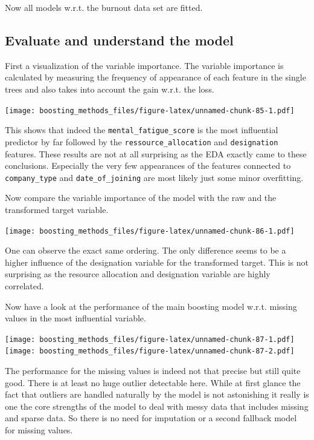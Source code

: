 \documentclass[
]{book}
\begin{document}
Now all models w.r.t. the burnout data set are fitted.

\hypertarget{evaluate-and-understand-the-model}{%
\subsection{Evaluate and understand the model}\label{evaluate-and-understand-the-model}}

First a visualization of the variable importance. The variable importance is calculated by measuring the frequency of appearance of each feature in the single trees and also takes into account the gain w.r.t. the loss.

\texttt{[image: boosting\_methods\_files/figure-latex/unnamed-chunk-85-1.pdf]}

This shows that indeed the \texttt{mental\_fatigue\_score} is the most influential predictor by far followed by the \texttt{ressource\_allocation} and \texttt{designation} features. These results are not at all surprising as the EDA exactly came to these conclusions. Especially the very few appearances of the features connected to \texttt{company\_type} and \texttt{date\_of\_joining} are most likely just some minor overfitting.

Now compare the variable importance of the model with the raw and the transformed target variable.

\texttt{[image: boosting\_methods\_files/figure-latex/unnamed-chunk-86-1.pdf]}

One can observe the exact same ordering. The only difference seems to be a higher influence of the designation variable for the transformed target. This is not surprising as the resource allocation and designation variable are highly correlated.

Now have a look at the performance of the main boosting model w.r.t. missing values in the most influential variable.

\texttt{[image: boosting\_methods\_files/figure-latex/unnamed-chunk-87-1.pdf]} \texttt{[image: boosting\_methods\_files/figure-latex/unnamed-chunk-87-2.pdf]}

The performance for the missing values is indeed not that precise but still quite good. There is at least no huge outlier detectable here. While at first glance the fact that outliers are handled naturally by the model is not astonishing it really is one the core strengths of the model to deal with messy data that includes missing and sparse data. So there is no need for imputation or a second fallback model for missing values.
\end{document}
